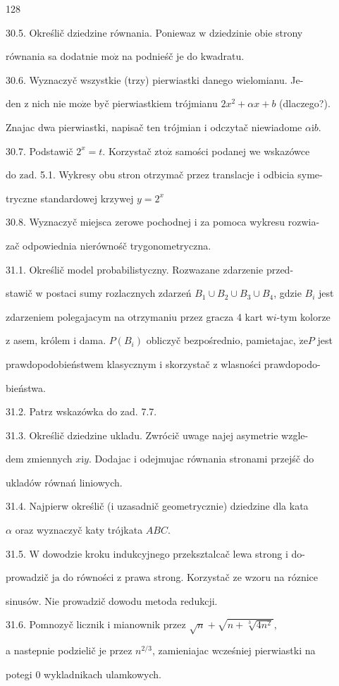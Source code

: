 \documentclass[a4paper,12pt]{article}
\begin{document}
128

30.5. Określič dziedzine równania. Poniewaz $\mathrm{w}$ dziedzinie obie strony

równania sa dodatnie $\mathrm{m}\mathrm{o}\dot{\mathrm{z}}$ na podnieśč je do kwadratu.

30.6. Wyznaczyč wszystkie (trzy) pierwiastki danego wielomianu. Je-

den $\mathrm{z}$ nich nie $\mathrm{m}\mathrm{o}\dot{\mathrm{z}}\mathrm{e}$ byč pierwiastkiem trójmianu $2x^{2}+\alpha x+b$ (dlaczego?).

Znajac dwa pierwiastki, napisač ten trójmian $\mathrm{i}$ odczytač niewiadome $\alpha \mathrm{i}b.$

30.7. Podstawič $2^{x}=t$. Korzystač $\mathrm{z}\mathrm{t}\mathrm{o}\dot{\mathrm{z}}$ samości podanej we wskazówce

do $\mathrm{z}\mathrm{a}\mathrm{d}$. 5.1. Wykresy obu stron otrzymač przez translacje $\mathrm{i}$ odbicia syme-

tryczne standardowej krzywej $y=2^{x}$

30.8. Wyznaczyč miejsca zerowe pochodnej $\mathrm{i}$ za pomoca wykresu rozwia-

zač odpowiednia nierównośč trygonometryczna.

31.1. Określič model probabilistyczny. Rozwazane zdarzenie przed-

stawič $\mathrm{w}$ postaci sumy rozlacznych zdarzeń $B_{1}\cup B_{2}\cup B_{3}\cup B_{4}$, gdzie $B_{i}$ jest

zdarzeniem polegajacym na otrzymaniu przez gracza 4 kart $\mathrm{w}i$-tym kolorze

$\mathrm{z}$ asem, królem $\mathrm{i}$ dama. $P(B_{i})$ obliczyč bezpośrednio, pamietajac, $\dot{\mathrm{z}}\mathrm{e}P$ jest

prawdopodobieństwem klasycznym $\mathrm{i}$ skorzystač $\mathrm{z}$ wlasności prawdopodo-

bieństwa.

31.2. Patrz wskazówka do zad. 7.7.

31.3. Określič dziedzine ukladu. Zwrócič uwage najej asymetrie wzgle-

dem zmiennych $x\mathrm{i}y$. Dodajac $\mathrm{i}$ odejmujac równania stronami przejśč do

ukladów równań liniowych.

31.4. Najpierw określič ($\mathrm{i}$ uzasadnič geometrycznie) dziedzine dla kata

$\alpha$ oraz wyznaczyč katy trójkata $ABC.$

31.5. $\mathrm{W}$ dowodzie kroku indukcyjnego przeksztalcač lewa strong $\mathrm{i}$ do-

prowadzič $\mathrm{j}\mathrm{a}$ do równości $\mathrm{z}$ prawa strong. Korzystač ze wzoru na róznice

sinusów. Nie prowadzič dowodu metoda redukcji.

31.6. Pomnozyč licznik $\mathrm{i}$ mianownik przez $\sqrt{n} + \sqrt{n+\sqrt[3]{4n^{2}}},$

a nastepnie podzielič je przez $n^{2/3}$, zamieniajac wcześniej pierwiastki na

potegi $0$ wykladnikach ulamkowych.
\end{document}
